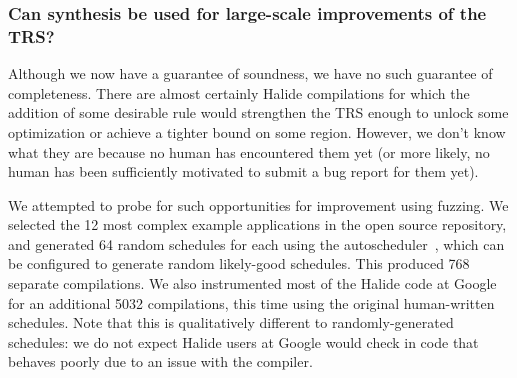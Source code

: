 \documentclass[acmsmall,review]{acmart}\settopmatter{printfolios=true,printccs=false,printacmref=false}
\begin{document}
\subsubsection{Can synthesis be used for large-scale improvements of the TRS?}
\label{sub:endtoendexperiment}


Although we now have a guarantee of soundness, we have no such guarantee of completeness. There are almost certainly Halide compilations for which the addition of some desirable rule would strengthen the TRS enough to unlock some optimization or achieve a tighter bound on some region. However, we don’t know what they are because no human has encountered them yet (or more likely, no human has been sufficiently motivated to submit a bug report for them yet). 

We attempted to probe for such opportunities for improvement using fuzzing. We selected the 12 most complex example applications in the open source repository, and generated 64 random schedules for each using the autoscheduler~\cite{Adams2019}, which can be configured to generate random likely-good schedules. This produced 768 separate compilations. We also instrumented most of the Halide code at Google for an additional 5032 compilations, this time using the original human-written schedules. Note that this is qualitatively different to randomly-generated schedules: we do not expect Halide users at Google would check in code that behaves poorly due to an issue with the compiler.
\end{document}
